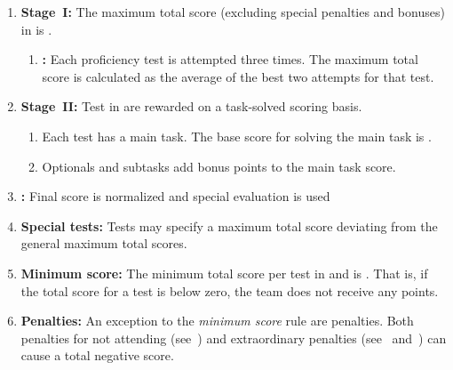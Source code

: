 \begin{enumerate}
	\item \textbf{Stage~I:} The maximum total score (excluding special penalties and bonuses) in  is .
	\begin{enumerate}
		\item \textbf{:} Each proficiency test is attempted three times. The maximum total score is calculated as the average of the best two attempts for that test.
	\end{enumerate}

	\item \textbf{Stage~II:} Test in  are rewarded on a task-solved scoring basis.
	\begin{enumerate}
		\item Each test has a main task. The base score for solving the main task is \scoring{250 points}.
		\item Optionals and subtasks add bonus points to the main task score.
	\end{enumerate}

	\item \textbf{:} Final score is normalized and special evaluation is used

	\item \textbf{Special tests:} Tests may specify a maximum total score deviating from the general maximum total scores.

	\item \textbf{Minimum score:} The minimum total score per test in  and  is . That is, if the total score for a test is below zero, the team does not receive any points.

	\item \textbf{Penalties:} An exception to the \emph{minimum score} rule are penalties. Both penalties for not
	      attending (see~) and extraordinary penalties (see~
	      and~) can cause a total negative score.


\end{enumerate}
